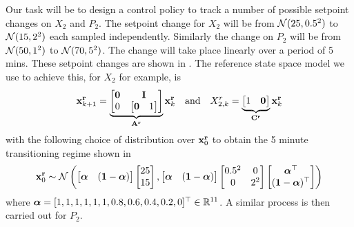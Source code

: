 Our task will be to design a control policy to track a number of possible setpoint changes on $X_2$ and $P_2$. The setpoint change for $X_2$ will be from $\mathcal{N}(25,0.5^2)$ to $\mathcal{N}(15,2^2)$ each sampled independently. Similarly the change on $P_2$ will be from $\mathcal{N}(50,1^2)$ to $\mathcal{N}(70,5^2)$. The change will take place linearly over a period of 5 mins. These setpoint changes are shown in . The reference state space model we use to achieve this, for $X_2$ for example, is
\begin{align*}
\mathbf{x}^{\mathbf{r}}_{k+1} = \underbrace{ \begin{bmatrix} \mathbf{0} & \mathbf{I} \\ 0 & \begin{bmatrix} \mathbf{0} & 1 \end{bmatrix} \end{bmatrix} }_{\mathbf{A}^{\mathbf{r}}}   \mathbf{x}^{\mathbf{r}}_{k}
\quad\text{and}\quad
X_{2,k}^r = \underbrace{ \begin{bmatrix} 1 & \mathbf{0} \end{bmatrix}  }_{\mathbf{C}^{\mathbf{r}}}   \mathbf{x}^{\mathbf{r}}_{k}
\end{align*}
with the following choice of distribution over $\mathbf{x}^{\mathbf{r}}_{0}$ to obtain the 5 minute transitioning regime shown in 
\begin{equation}
\mathbf{x}^{\mathbf{r}}_{0} \sim \mathcal{N}\left(
\begin{bmatrix} \boldsymbol{\alpha} & (\mathbf{1}-\boldsymbol{\alpha}) \end{bmatrix}\begin{bmatrix} 25 \\ 15 \end{bmatrix},
\begin{bmatrix} \boldsymbol{\alpha} & (\mathbf{1}-\boldsymbol{\alpha}) \end{bmatrix} \begin{bmatrix} 0.5^2 & 0 \\ 0 & 2^2 \end{bmatrix} \begin{bmatrix} \boldsymbol{\alpha}^\top \\ (\mathbf{1}-\boldsymbol{\alpha})^\top \end{bmatrix}
\right)
\end{equation}
where $\boldsymbol{\alpha} = [1,1,1,1,1,1,0.8,0.6,0.4,0.2,0]^\top \in \mathbb{R}^{11}$. A similar process is then carried out for $P_2$.






